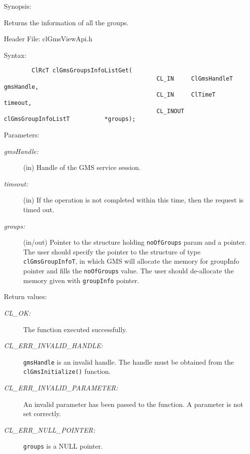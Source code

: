 \begin{flushleft}
\begin{Desc}
\item[Synopsis:]

 Returns the information of all the groups.  \end{Desc}

\begin{Desc}
  \item[Header File:]
  clGmsViewApi.h\end{Desc}

  \begin{Desc}
  \item[Syntax:]
  \footnotesize\begin{verbatim}        ClRcT clGmsGroupsInfoListGet(
                                     		CL_IN     ClGmsHandleT             gmsHandle,
                                     		CL_IN     ClTimeT                  timeout,
                                     		CL_INOUT  clGmsGroupInfoListT          *groups);
 \end{verbatim}
  \normalsize
  \end{Desc}

 \begin{Desc}
\item[Parameters:]
\begin{description}
  \item[{\em gmsHandle:}] (in) Handle of the GMS service session.
  \item[{\em timeout:}] (in) If the operation is not
completed within this time, then the request is timed out.
  \item[{\em groups:}] (in/out) Pointer to the structure holding {\tt{noOfGroups}} param and a pointer.
  The user should specify the pointer to the structure of type {\tt{clGmsGroupInfoT}},
  in which GMS will allocate the memory for groupInfo pointer and fills the {\tt{noOfGroups}}
  value. The user should de-allocate the memory given with {\tt{groupInfo}} pointer.
 \end{description}
 \end{Desc}

 \begin{Desc}
 \item[Return values:]
 \begin{description}
 \item[{\em CL\_\-OK:}]The function executed successfully.
\item[{\em CL\_\-ERR\_\-INVALID\_\-HANDLE:}] {\tt{gmsHandle}} is an invalid handle. The handle must be obtained from the
{\tt{clGmsInitialize()}} function. 
  \item[{\em CL\_\-ERR\_\-INVALID\_\-PARAMETER:}] An invalid parameter has been passed to the function. A parameter is not set correctly.
  \item[{\em CL\_\-ERR\_\-NULL\_\-POINTER:}] {\tt{groups}} is a NULL pointer.


\end{description}
\end{Desc}
\end{flushleft}
